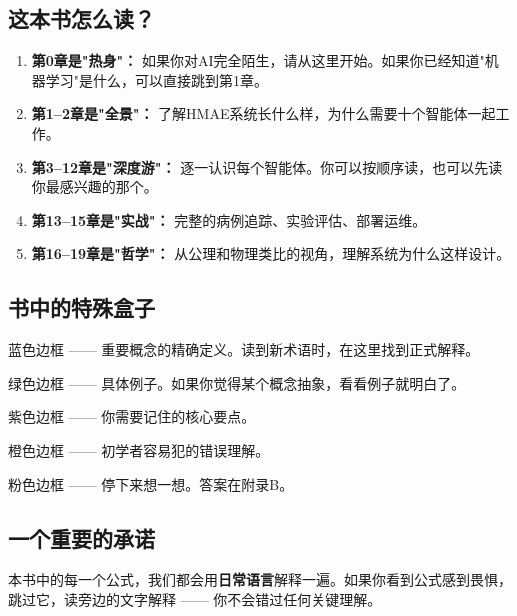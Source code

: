 \documentclass[11pt,a4paper]{ctexart}
\begin{document}
\subsection*{这本书怎么读？}

\begin{enumerate}[nosep]
\item \textbf{第0章是"热身"：} 如果你对AI完全陌生，请从这里开始。如果你已经知道"机器学习"是什么，可以直接跳到第1章。
\item \textbf{第1--2章是"全景"：} 了解HMAE系统长什么样，为什么需要十个智能体一起工作。
\item \textbf{第3--12章是"深度游"：} 逐一认识每个智能体。你可以按顺序读，也可以先读你最感兴趣的那个。
\item \textbf{第13--15章是"实战"：} 完整的病例追踪、实验评估、部署运维。
\item \textbf{第16--19章是"哲学"：} 从公理和物理类比的视角，理解系统为什么这样设计。
\end{enumerate}

\subsection*{书中的特殊盒子}

\begin{defbox}[定义盒子]
蓝色边框 —— 重要概念的精确定义。读到新术语时，在这里找到正式解释。
\end{defbox}

\begin{exambox}[例子盒子]
绿色边框 —— 具体例子。如果你觉得某个概念抽象，看看例子就明白了。
\end{exambox}

\begin{keybox}[关键洞察]
紫色边框 —— 你需要记住的核心要点。
\end{keybox}

\begin{warnbox}[常见误区]
橙色边框 —— 初学者容易犯的错误理解。
\end{warnbox}

\begin{exerbox}[思考题]
粉色边框 —— 停下来想一想。答案在附录B。
\end{exerbox}

\subsection*{一个重要的承诺}

本书中的每一个公式，我们都会用\textbf{日常语言}解释一遍。如果你看到公式感到畏惧，
跳过它，读旁边的文字解释 —— 你不会错过任何关键理解。
\end{document}
